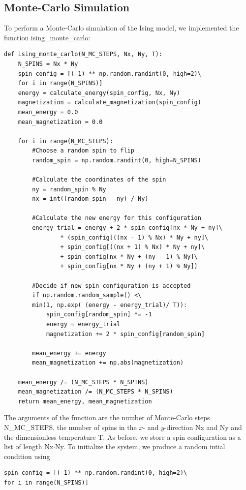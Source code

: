 \documentclass[a4paper,10pt,bibtotoc]{scrartcl}
\begin{document}
\subsection{Monte-Carlo Simulation}
To perform a Monte-Carlo simulation of the Ising model, we implemented the function ising\_monte\_carlo:
\begin{lstlisting}
def ising_monte_carlo(N_MC_STEPS, Nx, Ny, T):
    N_SPINS = Nx * Ny
    spin_config = [(-1) ** np.random.randint(0, high=2)\
    for i in range(N_SPINS)]
    energy = calculate_energy(spin_config, Nx, Ny)
    magnetization = calculate_magnetization(spin_config)
    mean_energy = 0.0
    mean_magnetization = 0.0
    
    for i in range(N_MC_STEPS):
        #Choose a random spin to flip
        random_spin = np.random.randint(0, high=N_SPINS)
        
        #Calculate the coordinates of the spin
        ny = random_spin % Ny
        nx = int((random_spin - ny) / Ny)
        
        #Calculate the new energy for this configuration
        energy_trial = energy + 2 * spin_config[nx * Ny + ny]\
                * (spin_config[((nx - 1) % Nx) * Ny + ny]\
                + spin_config[((nx + 1) % Nx) * Ny + ny]\
                + spin_config[nx * Ny + (ny - 1) % Ny]\
                + spin_config[nx * Ny + (ny + 1) % Ny])
        
        #Decide if new spin configuration is accepted
        if np.random.random_sample() <\
        min(1, np.exp( (energy - energy_trial)/ T)):
            spin_config[random_spin] *= -1
            energy = energy_trial
            magnetization += 2 * spin_config[random_spin]
        
        mean_energy += energy
        mean_magnetization += np.abs(magnetization)
        
    mean_energy /= (N_MC_STEPS * N_SPINS)
    mean_magnetization /= (N_MC_STEPS * N_SPINS)
    return mean_energy, mean_magnetization
\end{lstlisting}
The arguments of the function are the number of Monte-Carlo steps N\_MC\_STEPS, the number of spins in the $x$- and $y$-direction Nx and Ny and the dimensionless temperature T.
As before, we store a spin configuration as a list of length Nx$\cdot$Ny.
To initialize the system, we produce a random intial condition using 
\begin{lstlisting}
spin_config = [(-1) ** np.random.randint(0, high=2)\
for i in range(N_SPINS)]
\end{lstlisting}
\end{document}
